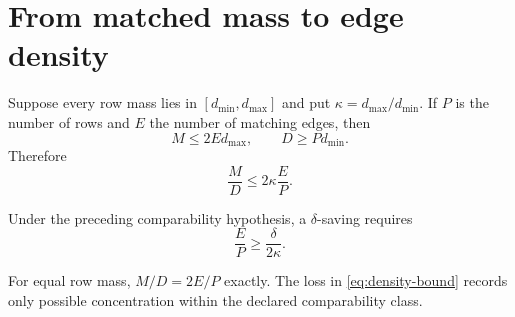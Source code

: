 \section{From matched mass to edge density}

Suppose every row mass lies in $[d_{\min},d_{\max}]$ and put
$\kappa=d_{\max}/d_{\min}$.  If $P$ is the number of rows and $E$ the number of
matching edges, then
\[
 M\le2E d_{\max},\qquad D\ge P d_{\min}.
\]
Therefore
\begin{equation}
 \frac MD\le2\kappa\frac EP.
 \label{eq:density-bound}
\end{equation}

\begin{corollary}
Under the preceding comparability hypothesis, a $\delta$-saving requires
\begin{equation}
 \frac EP\ge\frac{\delta}{2\kappa}.
 \label{eq:density-toll}
\end{equation}
\end{corollary}

For equal row mass, $M/D=2E/P$ exactly.  The loss in
\eqref{eq:density-bound} records only possible concentration within the declared
comparability class.
